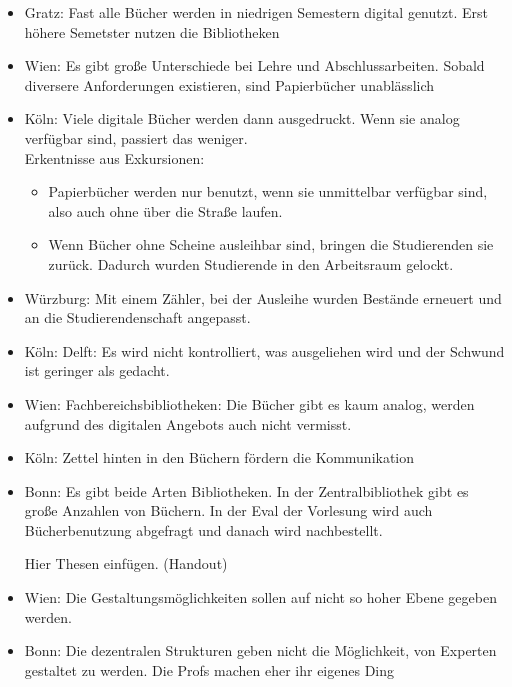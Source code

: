     \begin{itemize}
      \item Gratz: Fast alle Bücher werden in niedrigen Semestern digital genutzt. Erst höhere Semetster nutzen die Bibliotheken

      \item Wien: Es gibt große Unterschiede bei Lehre und Abschlussarbeiten. Sobald diversere Anforderungen existieren, sind Papierbücher unablässlich

      \item Köln: Viele digitale Bücher werden dann ausgedruckt. Wenn sie analog verfügbar sind, passiert das weniger. \\
      Erkentnisse aus Exkursionen:
      \begin{itemize}
        \item Papierbücher werden nur benutzt, wenn sie unmittelbar verfügbar sind, also auch ohne über die Straße laufen.
        \item Wenn Bücher ohne Scheine ausleihbar sind, bringen die Studierenden sie zurück. Dadurch wurden Studierende in den Arbeitsraum gelockt.
      \end{itemize}

      \item Würzburg: Mit einem Zähler, bei der Ausleihe wurden Bestände erneuert und an die Studierendenschaft angepasst.

      \item Köln: Delft: Es wird nicht kontrolliert, was ausgeliehen wird und der Schwund ist geringer als gedacht.

      \item Wien: Fachbereichsbibliotheken: Die Bücher gibt es kaum analog, werden aufgrund des digitalen Angebots auch nicht vermisst.

      \item Köln: Zettel hinten in den Büchern fördern die Kommunikation

      \item Bonn: Es gibt beide Arten Bibliotheken. In der Zentralbibliothek gibt es große Anzahlen von Büchern. In der Eval der Vorlesung wird auch Bücherbenutzung abgefragt und danach wird nachbestellt.

          Hier Thesen einfügen. (Handout)

      \item Wien: Die Gestaltungsmöglichkeiten sollen auf nicht so hoher Ebene gegeben werden.

      \item Bonn: Die dezentralen Strukturen geben nicht die Möglichkeit, von Experten gestaltet zu werden. Die Profs machen eher ihr eigenes Ding


\end{itemize}
